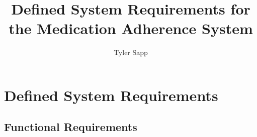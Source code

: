 \documentclass[
  12pt,
]{article}
\title{Defined System Requirements for the Medication Adherence System}
\author{Tyler Sapp}
\date{}
\renewcommand*\contentsname{Table of contents}
\newcommand\contentsname{Table of contents}
\begin{document}
\maketitle

\renewcommand*\contentsname{Table of contents}
{
\hypersetup{linkcolor=}
\setcounter{tocdepth}{3}
\tableofcontents
}

\section{Defined System Requirements}\label{defined-system-requirements}

\subsection{Functional Requirements}\label{functional-requirements}
\end{document}
